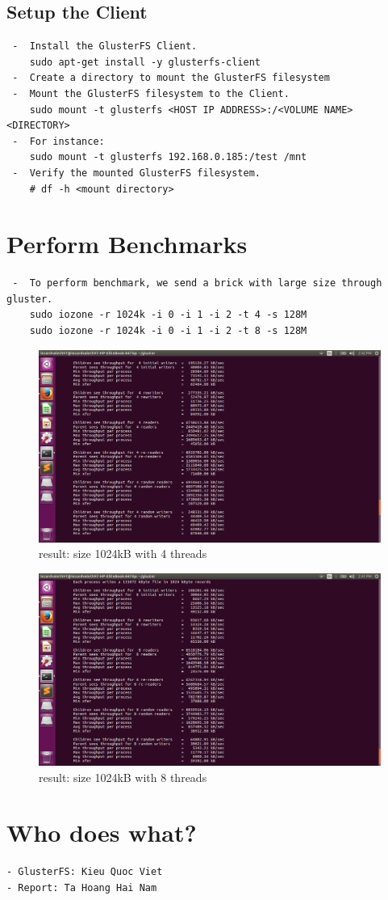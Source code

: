 \documentclass[11pt,a4paper]{article}
\begin{document}
\subsection {Setup the Client}
\begin{lstlisting} 
 -  Install the GlusterFS Client.
	sudo apt-get install -y glusterfs-client
 -  Create a directory to mount the GlusterFS filesystem
 -  Mount the GlusterFS filesystem to the Client.
	sudo mount -t glusterfs <HOST IP ADDRESS>:/<VOLUME NAME> <DIRECTORY>
 -  For instance:
	sudo mount -t glusterfs 192.168.0.185:/test /mnt
 -  Verify the mounted GlusterFS filesystem.
	# df -h <mount directory>
\end{lstlisting}
\newpage 
\section{Perform Benchmarks}
\begin{lstlisting} 
 -  To perform benchmark, we send a brick with large size through gluster.
	sudo iozone -r 1024k -i 0 -i 1 -i 2 -t 4 -s 128M
	sudo iozone -r 1024k -i 0 -i 1 -i 2 -t 8 -s 128M
\end{lstlisting}
\begin{figure}[h!]
\centering
\includegraphics[scale=0.5]{1024kB_4_128M.png}
\caption{result: size 1024kB with 4 threads}

\end{figure}

\begin{figure}[h!]
\centering
\includegraphics[scale=0.5]{1024kB_8_128M.png}
\caption{result: size 1024kB with 8 threads}
\end{figure}

\section{Who does what?}
\begin{lstlisting} 
- GlusterFS: Kieu Quoc Viet
- Report: Ta Hoang Hai Nam
\end{lstlisting}
\end{document}
